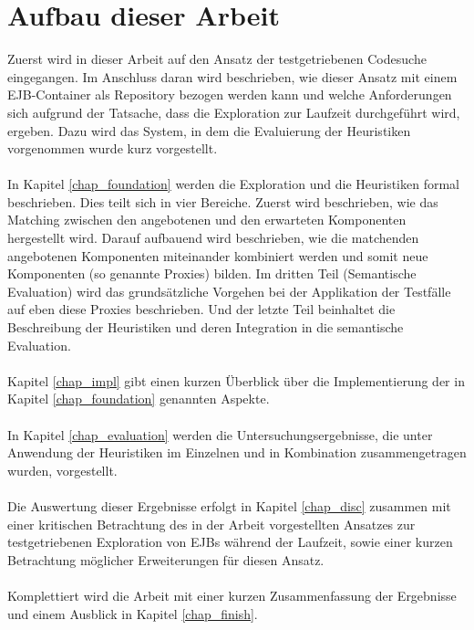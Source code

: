 \section{Aufbau dieser Arbeit}
Zuerst wird in dieser Arbeit auf den Ansatz der testgetriebenen Codesuche eingegangen. Im Anschluss daran wird beschrieben, wie dieser Ansatz mit einem EJB-Container als Repository bezogen werden kann und welche Anforderungen sich aufgrund der Tatsache, dass die Exploration zur Laufzeit durchgeführt wird, ergeben. Dazu wird das System, in dem die Evaluierung der Heuristiken vorgenommen wurde kurz vorgestellt.
\\\\
In Kapitel \ref{chap_foundation} werden die Exploration und die Heuristiken formal beschrieben. Dies teilt sich in vier Bereiche. Zuerst wird beschrieben, wie das Matching zwischen den angebotenen und den erwarteten Komponenten  hergestellt wird. Darauf aufbauend wird beschrieben, wie die matchenden angebotenen Komponenten miteinander kombiniert werden und somit neue Komponenten (so genannte Proxies) bilden. Im dritten Teil (Semantische Evaluation) wird das grundsätzliche Vorgehen bei der Applikation der Testfälle auf eben diese Proxies beschrieben. Und der letzte Teil beinhaltet die Beschreibung der Heuristiken und deren Integration in die semantische Evaluation.
\\\\
Kapitel \ref{chap_impl} gibt einen kurzen Überblick über die Implementierung der in Kapitel \ref{chap_foundation} genannten Aspekte.
\\\\
In Kapitel \ref{chap_evaluation} werden die Untersuchungsergebnisse, die unter Anwendung der Heuristiken im Einzelnen und in Kombination zusammengetragen wurden, vorgestellt. 
\\\\
Die Auswertung dieser Ergebnisse erfolgt in Kapitel \ref{chap_disc} zusammen mit einer kritischen Betrachtung des in der Arbeit vorgestellten Ansatzes zur testgetriebenen Exploration von EJBs während der Laufzeit, sowie einer kurzen Betrachtung möglicher Erweiterungen für diesen Ansatz.
\\\\
Komplettiert wird die Arbeit mit einer kurzen Zusammenfassung der Ergebnisse und einem Ausblick in Kapitel \ref{chap_finish}.
%